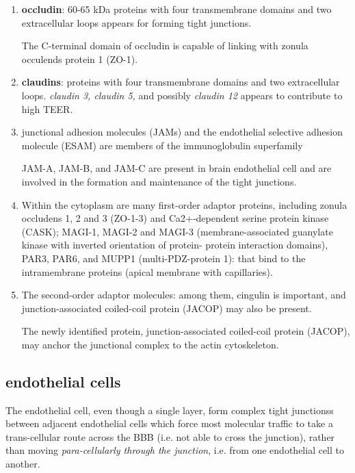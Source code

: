 \begin{enumerate}
  \item {\bf occludin}: 60-65 kDa proteins with four transmembrane domains
and two extracellular loops appears for forming tight junctions.

The C-terminal domain of occludin is capable of linking with zonula occulends
protein 1 (ZO-1).

  \item {\bf claudins}: proteins with four transmembrane domains
and two extracellular loops.  {\it claudin 3, claudin 5, } and possibly {\it
claudin 12} appears to contribute to high TEER.


\item junctional adhesion molecules (JAMs) and the endothelial selective adhesion
molecule (ESAM) are members of the immunoglobulin superfamily

JAM-A, JAM-B, and JAM-C are present in brain endothelial cell and are involved
in the formation and maintenance of the tight junctions.

\item Within the cytoplasm are many first-order adaptor proteins, including
zonula occludens 1, 2 and 3 (ZO-1-3) and Ca2+-dependent serine protein kinase
(CASK); MAGI-1, MAGI-2 and MAGI-3 (membrane-associated guanylate kinase with
inverted orientation of protein- protein interaction domains), PAR3, PAR6, and
MUPP1 (multi-PDZ-protein 1):
that bind to the intramembrane proteins (apical membrane with capillaries).

\item The second-order adaptor molecules: among them, cingulin is important, and
junction-associated coiled-coil protein (JACOP) may also be present.

The newly identified protein, junction-associated coiled-coil protein (JACOP),
may anchor the junctional complex to the actin cytoskeleton.
\end{enumerate}

\subsection{endothelial cells}
\label{sec:endothelial-cell}

The endothelial cell, even though a single layer, form complex tight junctionss
between adjacent endothelial cells which force most molecular traffic to take a
trans-cellular route across the BBB (i.e. not able to cross the junction),
rather than moving {\it para-cellularly through the junction}, i.e. from one
endothelial cell to another.



